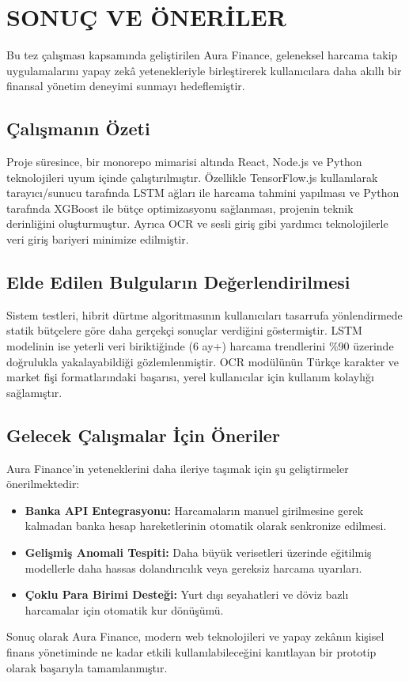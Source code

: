 \chapter{SONUÇ VE ÖNERİLER}

Bu tez çalışması kapsamında geliştirilen Aura Finance, geleneksel harcama takip uygulamalarını yapay zekâ yetenekleriyle birleştirerek kullanıcılara daha akıllı bir finansal yönetim deneyimi sunmayı hedeflemiştir.

\section{Çalışmanın Özeti}

Proje süresince, bir monorepo mimarisi altında React, Node.js ve Python teknolojileri uyum içinde çalıştırılmıştır. Özellikle TensorFlow.js kullanılarak tarayıcı/sunucu tarafında LSTM ağları ile harcama tahmini yapılması ve Python tarafında XGBoost ile bütçe optimizasyonu sağlanması, projenin teknik derinliğini oluşturmuştur. Ayrıca OCR ve sesli giriş gibi yardımcı teknolojilerle veri giriş bariyeri minimize edilmiştir.

\section{Elde Edilen Bulguların Değerlendirilmesi}

Sistem testleri, hibrit dürtme algoritmasının kullanıcıları tasarrufa yönlendirmede statik bütçelere göre daha gerçekçi sonuçlar verdiğini göstermiştir. LSTM modelinin ise yeterli veri biriktiğinde (6 ay+) harcama trendlerini \%90 üzerinde doğrulukla yakalayabildiği gözlemlenmiştir. OCR modülünün Türkçe karakter ve market fişi formatlarındaki başarısı, yerel kullanıcılar için kullanım kolaylığı sağlamıştır.

\section{Gelecek Çalışmalar İçin Öneriler}

Aura Finance'in yeteneklerini daha ileriye taşımak için şu geliştirmeler önerilmektedir:
\begin{itemize}
    \item \textbf{Banka API Entegrasyonu:} Harcamaların manuel girilmesine gerek kalmadan banka hesap hareketlerinin otomatik olarak senkronize edilmesi.
    \item \textbf{Gelişmiş Anomali Tespiti:} Daha büyük verisetleri üzerinde eğitilmiş modellerle daha hassas dolandırıcılık veya gereksiz harcama uyarıları.
    \item \textbf{Çoklu Para Birimi Desteği:} Yurt dışı seyahatleri ve döviz bazlı harcamalar için otomatik kur dönüşümü.
\end{itemize}

Sonuç olarak Aura Finance, modern web teknolojileri ve yapay zekânın kişisel finans yönetiminde ne kadar etkili kullanılabileceğini kanıtlayan bir prototip olarak başarıyla tamamlanmıştır.
